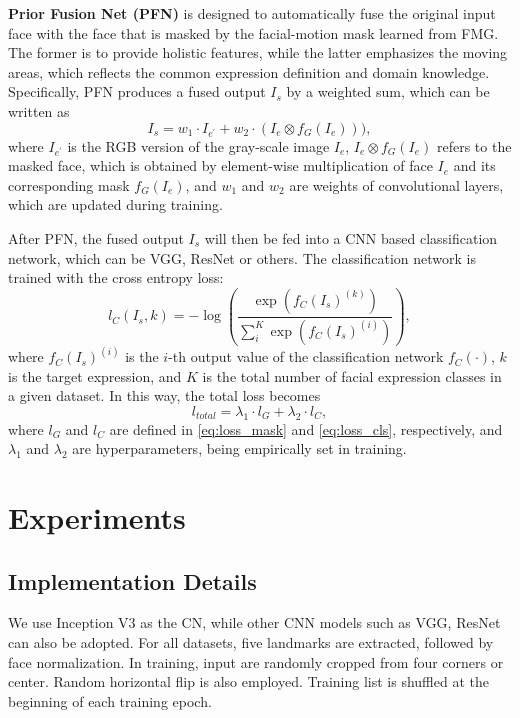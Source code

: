 \documentclass[conference,a4paper]{IEEEtran}
\begin{document}
\textbf{Prior Fusion Net (PFN)} is designed to automatically fuse the original input face with the face that is masked by the facial-motion mask learned from FMG. The former is to provide holistic features, while the latter emphasizes the moving areas, which reflects the common expression definition and domain knowledge. Specifically, PFN produces a fused output $I_s$ by a weighted sum, which can be written as 
\begin{equation}
\label{eq:balance_input}
I_s = w_1 \cdot I_{e^\prime} + w_2 \cdot (I_e \otimes f_G(I_e))), 
\end{equation}
where $I_{e^\prime}$ is the RGB version of the gray-scale image $I_e$, $I_e \otimes f_G(I_e)$ refers to the masked face, which is obtained by element-wise multiplication of face $I_e$ and its corresponding mask $f_G(I_e)$, and $w_1$ and $w_2$ are weights of convolutional layers, which are updated during training.

After PFN, the fused output $I_s$ will then be fed into a CNN based classification network, which can be VGG, ResNet or others. The classification network is trained with the cross entropy loss:
\begin{equation}
\label{eq:loss_cls}
l_C(I_s, k) = - \log(\frac{\exp(f_C(I_s)^{(k)})}{\sum_i^K\exp(f_C(I_s)^{(i)})} ),
\end{equation}
where $f_C(I_s)^{(i)}$ is the $i$-th output value of the classification network $f_C(\cdot)$, $k$ is the target expression, and $K$ is the total number of facial expression classes in a given dataset.
In this way, the total loss becomes
\begin{equation}
\label{eq:loss_total}
    l_{total} = \lambda_1 \cdot l_G + \lambda_2 \cdot l_C,
\end{equation}
where $l_G$ and $l_C$ are defined in \eqref{eq:loss_mask} and \eqref{eq:loss_cls}, respectively, and $\lambda_1$ and $\lambda_2$ are hyperparameters, being empirically set in training. 


\section{Experiments}


\subsection{Implementation Details}
We use Inception V3 as the CN, while other CNN models such as VGG, ResNet can also be adopted. For all datasets, five landmarks are extracted, followed by face normalization.
In training, input are randomly cropped from four corners or center. 
Random horizontal flip is also employed. 
Training list is shuffled at the beginning of each training epoch.
\end{document}
